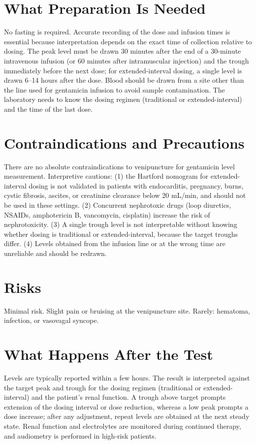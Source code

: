 \section*{What Preparation Is Needed}
No fasting is required. Accurate recording of the dose and infusion times is essential because interpretation depends on the exact time of collection relative to dosing. The peak level must be drawn 30 minutes after the end of a 30-minute intravenous infusion (or 60 minutes after intramuscular injection) and the trough immediately before the next dose; for extended-interval dosing, a single level is drawn 6--14 hours after the dose. Blood should be drawn from a site other than the line used for gentamicin infusion to avoid sample contamination. The laboratory needs to know the dosing regimen (traditional or extended-interval) and the time of the last dose.

\section*{Contraindications and Precautions}
There are no absolute contraindications to venipuncture for gentamicin level measurement. Interpretive cautions: (1) the Hartford nomogram for extended-interval dosing is not validated in patients with endocarditis, pregnancy, burns, cystic fibrosis, ascites, or creatinine clearance below 20 mL/min, and should not be used in these settings. (2) Concurrent nephrotoxic drugs (loop diuretics, NSAIDs, amphotericin B, vancomycin, cisplatin) increase the risk of nephrotoxicity. (3) A single trough level is not interpretable without knowing whether dosing is traditional or extended-interval, because the target troughs differ. (4) Levels obtained from the infusion line or at the wrong time are unreliable and should be redrawn.

\section*{Risks}
Minimal risk. Slight pain or bruising at the venipuncture site. Rarely: hematoma, infection, or vasovagal syncope.

\section*{What Happens After the Test}
Levels are typically reported within a few hours. The result is interpreted against the target peak and trough for the dosing regimen (traditional or extended-interval) and the patient's renal function. A trough above target prompts extension of the dosing interval or dose reduction, whereas a low peak prompts a dose increase; after any adjustment, repeat levels are obtained at the next steady state. Renal function and electrolytes are monitored during continued therapy, and audiometry is performed in high-risk patients.

